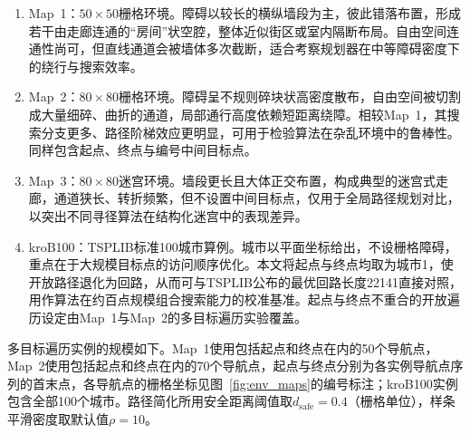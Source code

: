 \documentclass[lettersize,journal]{IEEEtran}
\begin{document}
\begin{enumerate}

\item Map~1：$50\times 50$栅格环境。障碍以较长的横纵墙段为主，彼此错落布置，形成若干由走廊连通的“房间”状空腔，整体近似街区或室内隔断布局。自由空间连通性尚可，但直线通道会被墙体多次截断，适合考察规划器在中等障碍密度下的绕行与搜索效率。

\item Map~2：$80\times 80$栅格环境。障碍呈不规则碎块状高密度散布，自由空间被切割成大量细碎、曲折的通道，局部通行高度依赖短距离绕障。相较Map~1，其搜索分支更多、路径阶梯效应更明显，可用于检验算法在杂乱环境中的鲁棒性。同样包含起点、终点与编号中间目标点。

\item Map~3：$80\times 80$迷宫环境。墙段更长且大体正交布置，构成典型的迷宫式走廊，通道狭长、转折频繁，但不设置中间目标点，仅用于全局路径规划对比，以突出不同寻径算法在结构化迷宫中的表现差异。

\item kroB100：TSPLIB标准100城市算例。城市以平面坐标给出，不设栅格障碍，重点在于大规模目标点的访问顺序优化。本文将起点与终点均取为城市1，使开放路径退化为回路，从而可与TSPLIB公布的最优回路长度22141直接对照，用作算法在约百点规模组合搜索能力的校准基准。起点与终点不重合的开放遍历设定由Map~1与Map~2的多目标遍历实验覆盖。

\end{enumerate}

多目标遍历实例的规模如下。Map~1使用包括起点和终点在内的50个导航点，Map~2使用包括起点和终点在内的70个导航点，起点与终点分别为各实例导航点序列的首末点，各导航点的栅格坐标见图~\textcolor{blue}{\ref{fig:env_maps}}的编号标注；kroB100实例包含全部100个城市。路径简化所用安全距离阈值取$d_{\mathrm{safe}} = 0.4$（栅格单位），样条平滑密度取默认值$\rho = 10$。
\end{document}

